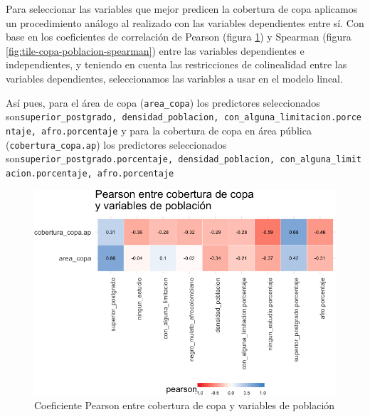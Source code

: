 \documentclass[12pt,]{book}
\begin{document}
Para seleccionar las variables que mejor predicen la cobertura de copa
aplicamos un procedimiento análogo al realizado con las variables
dependientes entre sí. Con base en los coeficientes de correlación de
Pearson (figura \ref{fig:tile-copa-poblacion-pearson}) y Spearman
(figura \ref{fig:tile-copa-poblacion-spearman}) entre las variables
dependientes e independientes, y teniendo en cuenta las restricciones de
colinealidad entre las variables dependientes, seleccionamos las
variables a usar en el modelo lineal.

Así pues, para el área de copa (\texttt{area\_copa}) los predictores
seleccionados
son\texttt{superior\_postgrado,\ densidad\_poblacion,\ con\_alguna\_limitacion.porcentaje,\ afro.porcentaje}
y para la cobertura de copa en área pública
(\texttt{cobertura\_copa.ap}) los predictores seleccionados
son\texttt{superior\_postgrado.porcentaje,\ densidad\_poblacion,\ con\_alguna\_limitacion.porcentaje,\ afro.porcentaje}

\begin{figure}
\includegraphics[width=1\linewidth]{tesis-unigis_files/figure-latex/tile-copa-poblacion-pearson-1} \caption{Coeficiente Pearson entre cobertura de copa
 y variables de población}\label{fig:tile-copa-poblacion-pearson}
\end{figure}
\end{document}
